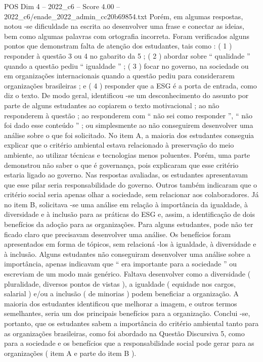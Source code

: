 \begin{textsample}{POS Dim 4 – 2022\_c6 – Score 4.00 – 2022\_c6/enade\_2022\_admin\_cc20b69854.txt}
Porém, em algumas respostas, notou -se dificuldade na escrita ao desenvolver uma frase e conectar as ideias, bem como algumas palavras com ortografia incorreta.
Foram verificados alguns pontos que demonstram falta de atenção dos estudantes, tais como : ( 1 ) responder à questão 3 ou 4 no gabarito da 5 ; ( 2 ) abordar sobre “ qualidade ” quando a questão pediu “ igualdade ” ; ( 3 ) focar no governo, na sociedade ou em organizações internacionais quando a questão pediu para considerarem organizações brasileiras ; e ( 4 ) responder que a ESG é a porta de entrada, como diz o texto.
De modo geral, identificou -se um desconhecimento do assunto por parte de alguns estudantes ao copiarem o texto motivacional ; ao não responderem à questão ; ao responderem com “ não sei como responder ”, “ não foi dado esse conteúdo ” ; ou simplesmente ao não conseguirem desenvolver uma análise sobre o que foi solicitado.
No item A, a maioria dos estudantes conseguia explicar que o critério ambiental estava relacionado à preservação do meio ambiente, ao utilizar técnicas e tecnologias menos poluentes.
Porém, uma parte demonstrou não saber o que é governança, pois explicaram que esse critério estaria ligado ao governo.
Nas respostas avaliadas, os estudantes apresentavam que esse pilar seria responsabilidade do governo.
Outros também indicaram que o critério social seria apenas olhar a sociedade, sem relacionar aos colaboradores.
Já no item B, solicitava -se uma análise em relação à importância da igualdade, à diversidade e à inclusão para as práticas do ESG e, assim, a identificação de dois benefícios da adoção para as organizações.
Para alguns estudantes, pode não ter ficado claro que precisavam desenvolver uma análise.
Os benefícios foram apresentados em forma de tópicos, sem relacioná -los à igualdade, à diversidade e à inclusão.
Alguns estudantes não conseguiram desenvolver uma análise sobre a importância, apenas indicavam que “ era importante para a sociedade ” ou escreviam de um modo mais genérico.
Faltava desenvolver como a diversidade ( pluralidade, diversos pontos de vistas ), a igualdade ( equidade nos cargos, salarial ) e/ou a inclusão ( de minorias ) podem beneficiar a organização.
A maioria dos estudantes identificou que melhorar a imagem, e outros termos semelhantes, seria um dos principais benefícios para a organização.
Conclui -se, portanto, que os estudantes sabem a importância do critério ambiental tanto para as organizações brasileiras, como foi abordado na Questão Discursiva 5, como para a sociedade e os benefícios que a responsabilidade social pode gerar para as organizações ( item A e parte do item B ).

\end{textsample}
